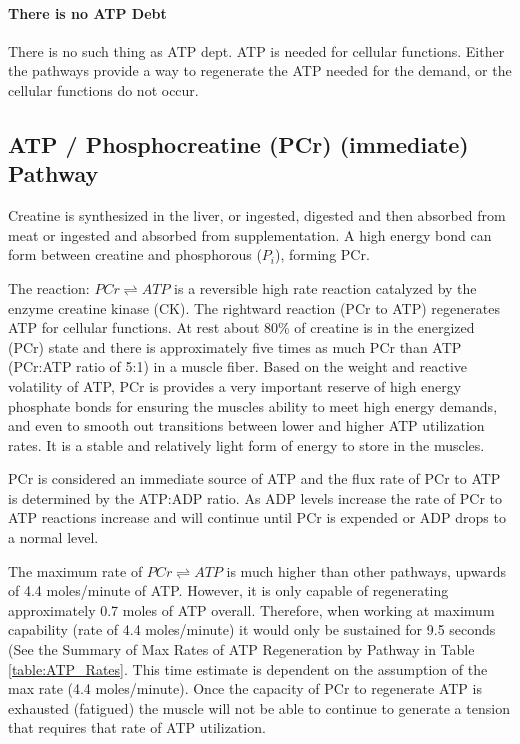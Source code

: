 \paragraph{There is no ATP Debt}

There is no such thing as ATP dept. ATP is needed for cellular functions. Either the pathways provide a way to regenerate the ATP needed for the demand, or the cellular functions do not occur.


\subsection{ATP / Phosphocreatine (PCr) (immediate) Pathway}

Creatine is synthesized in the liver, or ingested, digested and then absorbed from meat or ingested and absorbed from supplementation.\footnotemark{} A high energy bond can form between creatine and phosphorous ($P_i$), forming PCr.

The reaction: $PCr \rightleftharpoons ATP$ is a reversible high rate reaction catalyzed by the enzyme creatine kinase (CK). The rightward reaction (PCr to ATP) regenerates ATP for cellular functions. At rest about 80\% of creatine is in the energized (PCr) state and there is approximately five times as much PCr than ATP (PCr:ATP ratio of 5:1) in a muscle fiber. Based on the weight and reactive volatility of ATP, PCr is provides a very important reserve of high energy phosphate bonds for ensuring the muscles ability to meet high energy demands, and even to smooth out transitions between lower and higher ATP utilization rates.\footnotemark{} It is a stable and relatively light form of energy to store in the muscles.

PCr is considered an immediate source of ATP and the flux rate of PCr to ATP is determined by the ATP:ADP ratio. As ADP levels increase the rate of PCr to ATP reactions increase and will continue until PCr is expended or ADP drops to a normal level.

The maximum rate of $PCr \rightleftharpoons ATP$ is much higher than other pathways, upwards of 4.4 moles/minute of ATP. However, it is only capable of regenerating approximately 0.7 moles of ATP overall. Therefore, when working at maximum capability (rate of 4.4 moles/minute) it would only be sustained for 9.5 seconds (See the Summary of Max Rates of ATP Regeneration by Pathway in Table \ref{table:ATP_Rates}. This time estimate is dependent on the assumption of the max rate (4.4 moles/minute). Once the capacity of PCr to regenerate ATP is exhausted (fatigued) the muscle will not be able to continue to generate a tension that requires that rate of ATP utilization.


